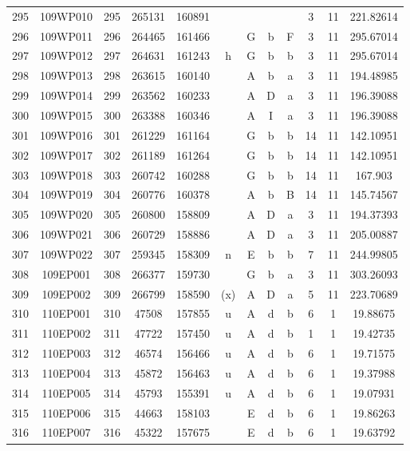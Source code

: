 \begin{tabular}{|*{12}{c|}}
295 & 109WP010 & 295 & 265131 & 160891 &  &  &  &  & 3 & 11 & 221.82614 \\ 
296 & 109WP011 & 296 & 264465 & 161466 &  & G & b & F & 3 & 11 & 295.67014 \\ 
297 & 109WP012 & 297 & 264631 & 161243 & h & G & b & b & 3 & 11 & 295.67014 \\ 
298 & 109WP013 & 298 & 263615 & 160140 &  & A & b & a & 3 & 11 & 194.48985 \\ 
299 & 109WP014 & 299 & 263562 & 160233 &  & A & D & a & 3 & 11 & 196.39088 \\ 
300 & 109WP015 & 300 & 263388 & 160346 &  & A & I & a & 3 & 11 & 196.39088 \\ 
301 & 109WP016 & 301 & 261229 & 161164 &  & G & b & b & 14 & 11 & 142.10951 \\ 
302 & 109WP017 & 302 & 261189 & 161264 &  & G & b & b & 14 & 11 & 142.10951 \\ 
303 & 109WP018 & 303 & 260742 & 160288 &  & G & b & b & 14 & 11 & 167.903 \\ 
304 & 109WP019 & 304 & 260776 & 160378 &  & A & b & B & 14 & 11 & 145.74567 \\ 
305 & 109WP020 & 305 & 260800 & 158809 &  & A & D & a & 3 & 11 & 194.37393 \\ 
306 & 109WP021 & 306 & 260729 & 158886 &  & A & D & a & 3 & 11 & 205.00887 \\ 
307 & 109WP022 & 307 & 259345 & 158309 & n & E & b & b & 7 & 11 & 244.99805 \\ 
308 & 109EP001 & 308 & 266377 & 159730 &  & G & b & a & 3 & 11 & 303.26093 \\ 
309 & 109EP002 & 309 & 266799 & 158590 & (x) & A & D & a & 5 & 11 & 223.70689 \\ 
310 & 110EP001 & 310 & 47508 & 157855 & u & A & d & b & 6 & 1 & 19.88675 \\ 
311 & 110EP002 & 311 & 47722 & 157450 & u & A & d & b & 1 & 1 & 19.42735 \\ 
312 & 110EP003 & 312 & 46574 & 156466 & u & A & d & b & 6 & 1 & 19.71575 \\ 
313 & 110EP004 & 313 & 45872 & 156463 & u & A & d & b & 6 & 1 & 19.37988 \\ 
314 & 110EP005 & 314 & 45793 & 155391 & u & A & d & b & 6 & 1 & 19.07931 \\ 
315 & 110EP006 & 315 & 44663 & 158103 &  & E & d & b & 6 & 1 & 19.86263 \\ 
316 & 110EP007 & 316 & 45322 & 157675 &  & E & d & b & 6 & 1 & 19.63792 \\ 

\end{tabular}
